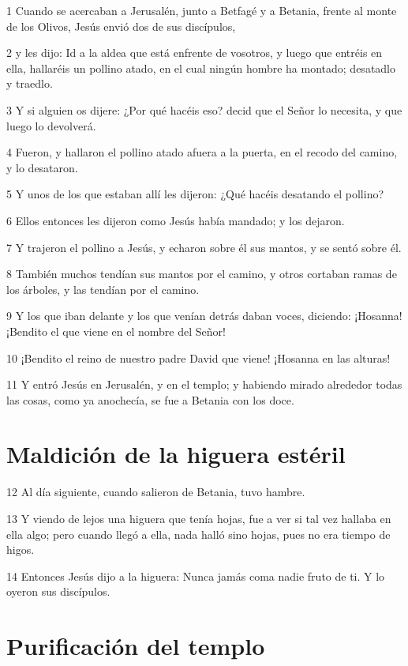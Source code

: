 \par 1 Cuando se acercaban a Jerusalén, junto a Betfagé y a Betania, frente al monte de los Olivos, Jesús envió dos de sus discípulos,
\par 2 y les dijo: Id a la aldea que está enfrente de vosotros, y luego que entréis en ella, hallaréis un pollino atado, en el cual ningún hombre ha montado; desatadlo y traedlo.
\par 3 Y si alguien os dijere: ¿Por qué hacéis eso? decid que el Señor lo necesita, y que luego lo devolverá.
\par 4 Fueron, y hallaron el pollino atado afuera a la puerta, en el recodo del camino, y lo desataron.
\par 5 Y unos de los que estaban allí les dijeron: ¿Qué hacéis desatando el pollino?
\par 6 Ellos entonces les dijeron como Jesús había mandado; y los dejaron.
\par 7 Y trajeron el pollino a Jesús, y echaron sobre él sus mantos, y se sentó sobre él.
\par 8 También muchos tendían sus mantos por el camino, y otros cortaban ramas de los árboles, y las tendían por el camino.
\par 9 Y los que iban delante y los que venían detrás daban voces, diciendo: ¡Hosanna! ¡Bendito el que viene en el nombre del Señor!
\par 10 ¡Bendito el reino de nuestro padre David que viene! ¡Hosanna en las alturas!
\par 11 Y entró Jesús en Jerusalén, y en el templo; y habiendo mirado alrededor todas las cosas, como ya anochecía, se fue a Betania con los doce.

\section*{Maldición de la higuera estéril}

\par 12 Al día siguiente, cuando salieron de Betania, tuvo hambre.
\par 13 Y viendo de lejos una higuera que tenía hojas, fue a ver si tal vez hallaba en ella algo; pero cuando llegó a ella, nada halló sino hojas, pues no era tiempo de higos.
\par 14 Entonces Jesús dijo a la higuera: Nunca jamás coma nadie fruto de ti. Y lo oyeron sus discípulos.

\section*{Purificación del templo}

